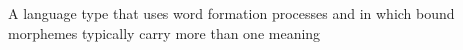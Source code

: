 A language type that uses word formation processes and in which bound morphemes typically carry more than one meaning
